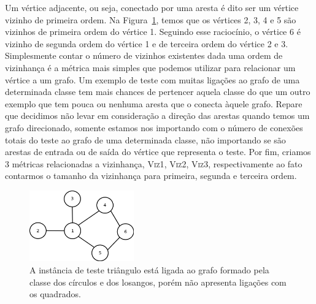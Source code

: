 Um vértice adjacente, ou seja, conectado por uma aresta é dito ser um vértice vizinho de primeira ordem. Na Figura~\ref{fig::vizinhos}, temos que os vértices 2, 3, 4 e 5 são vizinhos de primeira ordem do vértice 1. Seguindo esse raciocínio, o vértice 6 é vizinho de segunda ordem do vértice 1 e de terceira ordem do vértice 2 e 3. Simplesmente contar o número de vizinhos existentes dada uma ordem de vizinhança é a métrica mais simples que podemos utilizar para relacionar um vértice a um grafo. Um exemplo de teste com muitas ligações ao grafo de uma determinada classe tem mais chances de pertencer aquela classe do que um outro exemplo que tem pouca ou nenhuma aresta que o conecta àquele grafo. Repare que decidimos não levar em consideração a direção das arestas quando temos um grafo direcionado, somente estamos nos importando com o número de conexões totais do teste ao grafo de uma determinada classe, não importando se são arestas de entrada ou de saída do vértice que representa o teste. Por fim, criamos 3 métricas relacionadas a vizinhança, \textsc{Viz1}, \textsc{Viz2}, \textsc{Viz3}, respectivamente ao fato contarmos o tamanho da vizinhança para primeira, segunda e terceira ordem.

\begin{figure}[ht!]
\centering
\includegraphics[width=0.4\textwidth]{figures/vizinhos.png}
\caption{A instância de teste triângulo está ligada ao grafo formado pela classe dos círculos e dos losangos, porém não apresenta ligações com os quadrados.}
\label{fig::vizinhos}
\end{figure}

